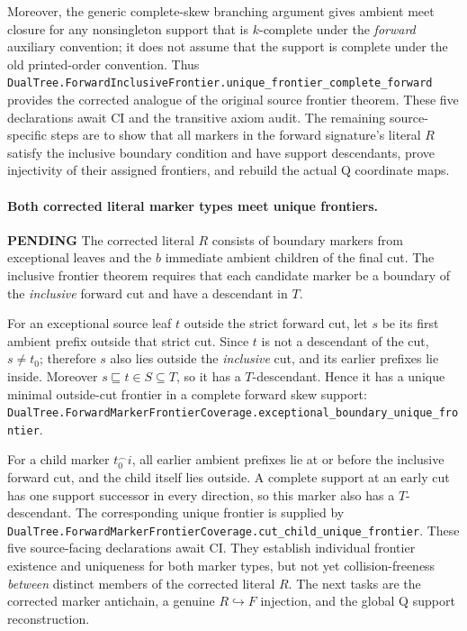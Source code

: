 \documentclass[11pt]{article}
\newcommand{\todo}{\textcolor{gray!70!black}{\textbf{PENDING}}}
\newcommand{\lean}[1]{\texttt{#1}}
\begin{document}
Moreover, the generic complete-skew
branching argument gives ambient meet
closure for any nonsingleton support
that is $k$-complete under the \emph{forward}
auxiliary convention; it does not assume
that the support is complete under the
old printed-order convention.
Thus
\lean{DualTree.ForwardInclusiveFrontier.unique_frontier_complete_forward}
provides the corrected analogue of the
original source frontier theorem.
These five declarations await CI and the
transitive axiom audit.
The remaining source-specific steps are
to show that all markers in the forward
signature's literal $R$ satisfy the
inclusive boundary condition and have
support descendants, prove injectivity
of their assigned frontiers, and
rebuild the actual Q coordinate maps.

\paragraph{Both corrected literal marker types meet unique frontiers.} \todo
The corrected literal $R$ consists of boundary
markers from exceptional leaves and the $b$
immediate ambient children of the final cut.
The inclusive frontier theorem requires that
each candidate marker be a boundary of the
\emph{inclusive} forward cut and have a
descendant in $T$.

For an exceptional source leaf $t$ outside
the strict forward cut, let $s$ be its first
ambient prefix outside that strict cut.
Since $t$ is not a descendant of the cut,
$s\ne t_0$; therefore $s$ also lies
outside the \emph{inclusive} cut, and
its earlier prefixes lie inside.
Moreover $s\sqsubseteq t\in S\subseteq T$,
so it has a $T$-descendant. Hence it
has a unique minimal outside-cut frontier
in a complete forward skew support:
\lean{DualTree.ForwardMarkerFrontierCoverage.exceptional_boundary_unique_frontier}.

For a child marker $t_0^\frown i$,
all earlier ambient prefixes lie at or before
the inclusive forward cut, and the child
itself lies outside. A complete support
at an early cut has one support successor
in every direction, so this marker also
has a $T$-descendant. The corresponding
unique frontier is supplied by
\lean{DualTree.ForwardMarkerFrontierCoverage.cut_child_unique_frontier}.
These five source-facing declarations await CI.
They establish individual frontier existence
and uniqueness for both marker types, but not
yet collision-freeness \emph{between} distinct
members of the corrected literal $R$.
The next tasks are the corrected marker antichain,
a genuine $R\hookrightarrow F$ injection, and
the global Q support reconstruction.
\end{document}
